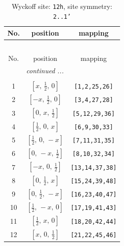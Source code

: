 \documentclass[fleqn,8pt]{jsarticle}
\begin{document}
\begin{longtable}{ccc}
\caption{Wyckoff site: {\tt 12h}, site symmetry: {\tt 2..1'}}
 \\
 \hline \hline
No. & position & mapping \\ \hline \endfirsthead

\multicolumn{2}{l}{\tablename\ \thetable{}} \\
 \hline \hline
No. & position & mapping \\ \hline \endhead

 \hline \hline
\multicolumn{2}{r}{\footnotesize\it continued ...} \\ \endfoot

 \hline \hline
\multicolumn{2}{r}{} \\ \endlastfoot

1 & $\left[ x,\, \frac{1}{2},\, 0 \right]$ & {\tt [1,2,25,26]} \\ \hline
2 & $\left[ - x,\, \frac{1}{2},\, 0 \right]$ & {\tt [3,4,27,28]} \\ \hline
3 & $\left[ 0,\, x,\, \frac{1}{2} \right]$ & {\tt [5,12,29,36]} \\ \hline
4 & $\left[ \frac{1}{2},\, 0,\, x \right]$ & {\tt [6,9,30,33]} \\ \hline
5 & $\left[ \frac{1}{2},\, 0,\, - x \right]$ & {\tt [7,11,31,35]} \\ \hline
6 & $\left[ 0,\, - x,\, \frac{1}{2} \right]$ & {\tt [8,10,32,34]} \\ \hline
7 & $\left[ - x,\, 0,\, \frac{1}{2} \right]$ & {\tt [13,14,37,38]} \\ \hline
8 & $\left[ 0,\, \frac{1}{2},\, x \right]$ & {\tt [15,24,39,48]} \\ \hline
9 & $\left[ 0,\, \frac{1}{2},\, - x \right]$ & {\tt [16,23,40,47]} \\ \hline
10 & $\left[ \frac{1}{2},\, - x,\, 0 \right]$ & {\tt [17,19,41,43]} \\ \hline
11 & $\left[ \frac{1}{2},\, x,\, 0 \right]$ & {\tt [18,20,42,44]} \\ \hline
12 & $\left[ x,\, 0,\, \frac{1}{2} \right]$ & {\tt [21,22,45,46]} \\
\end{longtable}
\renewcommand{\arraystretch}{1.2}
\end{document}
